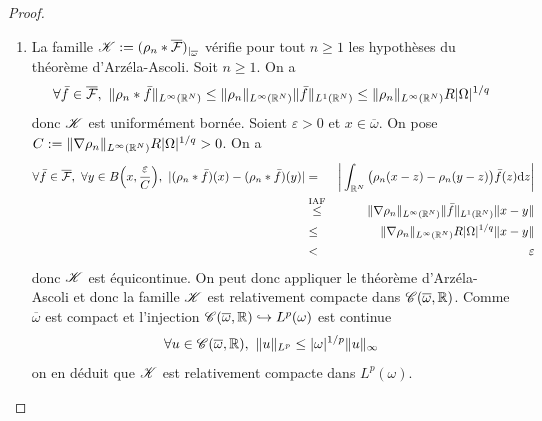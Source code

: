 \begin{proof}
\begin{enumerate}
\begin{equation*}
            \int_{\omega}|(\rho_n*\bar{f})(x)-\bar{f}(x)|^p \d x \leq \int_{B(0,1/n)}\rho_n(y)\int_{\omega}\big|\bar{f}(x-y)-\bar{f}(x)\big|^p\d x \d y
        \end{equation*}
        en prenant $n$ tel que $1/n < \delta$, on obtient par hypothèse 
        \begin{equation*}
            \int_{\omega}|(\rho_n*\bar{f})(x)-\bar{f}(x)|^p \d x \leq \int_{B(0,1/n)}\rho_n(y)\int_{\omega}\big|\bar{f}(x-y)-\bar{f}(x)\big|^p\d x \d y < \varepsilon^p
        \end{equation*}
        \item La famille $\mathscr{K}:=(\rho_n*\overline{\mathcal{F}})_{|_{\overline{\omega}}}$ vérifie pour tout $n\geq 1$ les hypothèses du théorème d'Arzéla-Ascoli. Soit $n \ge 1$. On a 
        \begin{equation*}
            \forall \bar{f} \in \overline{\mathcal{F}}, \ \|\rho_n*\bar{f}\|_{L^\infty(\mathbb{R}^N)} \leq \|\rho_n\|_{L^\infty(\mathbb{R}^N)}\|\bar{f}\|_{L^1(\mathbb{R}^N)} \leq \|\rho_n\|_{L^\infty(\mathbb{R}^N)}R|\Omega|^{1/q}
        \end{equation*}
        donc $\mathscr{K}$ est uniformément bornée. Soient $\varepsilon >0$ et $x \in \overline{\omega}$. On pose $C:=\|\nabla\rho_n\|_{L^\infty(\mathbb{R}^N)}R|\Omega|^{1/q} >0$. On a 
        \begin{eqnarray*}
            \forall \bar{f} \in \overline{\calF}, \ \forall y \in B\Big(x, \frac{\varepsilon}{C}\Big), \ |(\rho_n*\bar{f})(x)-(\rho_n*\bar{f})(y)|&=& \bigg|\int_{\bbR^N}\big(\rho_n(x-z)-\rho_n(y-z)\big)\bar{f}(z)\d z\bigg| \\
            &\overset{\text{IAF}}{\leq}& \|\nabla\rho_n\|_{L^\infty(\bbR^N)}\|\bar{f}\|_{L^1(\bbR^N)}\|x-y\| \\
            &\leq& \|\nabla\rho_n\|_{L^\infty(\bbR^N)}R|\Omega|^{1/q}\|x-y\| \\
            &<&\varepsilon
        \end{eqnarray*}
        donc $\mathscr{K}$ est équicontinue. On peut donc appliquer le théorème d'Arzéla-Ascoli et donc la famille $\mathscr{K}$ est relativement compacte dans $\mathscr{C}(\overline{\omega},\mathbb{R})$. Comme $\overline{\omega}$ est compact et l'injection $\mathscr{C}(\overline{\omega},\mathbb{R}) \hookrightarrow L^p(\omega)$ est continue 
        \begin{equation*}
            \forall u \in \mathscr{C}(\overline{\omega},\mathbb{R}), \ \|u\|_{L^p} \leq |\omega|^{1/p}\|u\|_{\infty}
        \end{equation*}
        on en déduit que $\mathscr{K}$ est relativement compacte dans $L^p(\omega)$.

\end{enumerate}
\end{proof}
